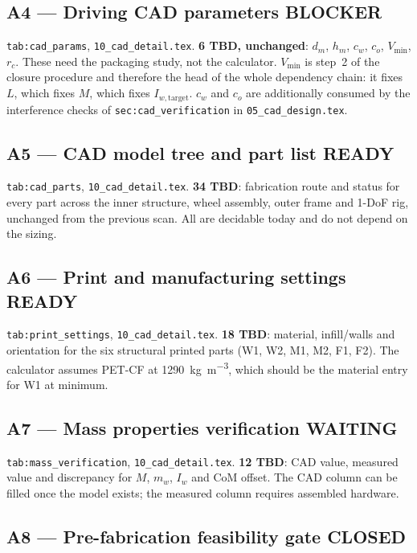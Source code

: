 \documentclass[11pt,a4paper]{article}
\newcommand{\blocker}{\textcolor{blockcol}{\textbf{BLOCKER}}}
\newcommand{\ready}{\textcolor{readycol}{\textbf{READY}}}
\newcommand{\waiting}{\textcolor{waitcol}{\textbf{WAITING}}}
\newcommand{\closed}{\textcolor{closedcol}{\textbf{CLOSED}}}
\begin{document}
\subsection{A4 --- Driving CAD parameters \quad \blocker}

\texttt{tab:cad\_params}, \texttt{10\_cad\_detail.tex}. \textbf{6 TBD,
unchanged}: $d_m$, $h_m$, $c_w$, $c_o$, $V_{\min}$, $r_c$. These need the
packaging study, not the calculator. $V_{\min}$ is step~2 of the closure
procedure and therefore the head of the whole dependency chain: it fixes $L$,
which fixes $M$, which fixes $I_{w,\text{target}}$. $c_w$ and $c_o$ are
additionally consumed by the interference checks of
\texttt{sec:cad\_verification} in \texttt{05\_cad\_design.tex}.

\subsection{A5 --- CAD model tree and part list \quad \ready}

\texttt{tab:cad\_parts}, \texttt{10\_cad\_detail.tex}. \textbf{34 TBD}:
fabrication route and status for every part across the inner structure, wheel
assembly, outer frame and 1-DoF rig, unchanged from the previous scan. All are
decidable today and do not depend on the sizing.

\subsection{A6 --- Print and manufacturing settings \quad \ready}

\texttt{tab:print\_settings}, \texttt{10\_cad\_detail.tex}. \textbf{18 TBD}:
material, infill/walls and orientation for the six structural printed parts
(W1, W2, M1, M2, F1, F2). The calculator assumes PET-CF at
\qty{1290}{\kilo\gram\per\metre\cubed}, which should be the material entry for
W1 at minimum.

\subsection{A7 --- Mass properties verification \quad \waiting}

\texttt{tab:mass\_verification}, \texttt{10\_cad\_detail.tex}. \textbf{12
TBD}: CAD value, measured value and discrepancy for $M$, $m_w$, $I_w$ and CoM
offset. The CAD column can be filled once the model exists; the measured
column requires assembled hardware.

\subsection{A8 --- Pre-fabrication feasibility gate \quad \closed}
\end{document}
